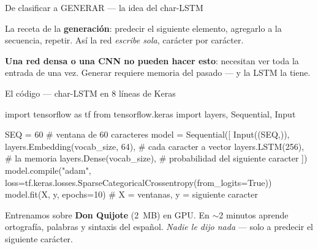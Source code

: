 \documentclass[aspectratio=169, 11pt]{beamer}
\begin{document}
\begin{frame}[shrink]{De clasificar a GENERAR --- la idea del char-LSTM}
  \vspace{4pt}
  \begin{center}
  \end{center}
  \vspace{6pt}
  \begin{tcolorbox}[colback=arcaRed!8, colframe=arcaRed, leftrule=3pt,
    boxrule=0pt, sharp corners, left=8pt, right=8pt, top=6pt, bottom=6pt]
    {\small\color{arcaDark}
    La receta de la \textbf{generación}: predecir el siguiente elemento, agregarlo
    a la secuencia, repetir. Así la red \emph{escribe sola}, carácter por carácter.\par
    \vspace{2pt}
    \textbf{Una red densa o una CNN no pueden hacer esto}: necesitan ver toda la
    entrada de una vez. Generar requiere memoria del pasado --- y la LSTM la tiene.}
  \end{tcolorbox}
\end{frame}

\begin{frame}{El código --- char-LSTM en 8 líneas de Keras}
  \begin{pyblock}
import tensorflow as tf
from tensorflow.keras import layers, Sequential, Input

SEQ = 60                                  # ventana de 60 caracteres
model = Sequential([
    Input((SEQ,)),
    layers.Embedding(vocab_size, 64),     # cada caracter a vector
    layers.LSTM(256),                     # la memoria
    layers.Dense(vocab_size),             # probabilidad del siguiente caracter
])
model.compile("adam", loss=tf.keras.losses.SparseCategoricalCrossentropy(from_logits=True))
model.fit(X, y, epochs=10)                # X = ventanas, y = siguiente caracter
  \end{pyblock}
  \vspace{4pt}
  {\footnotesize\color{arcaDark}
  Entrenamos sobre \textbf{Don Quijote} (2~MB) en GPU. En $\sim$2 minutos aprende
  ortografía, palabras y sintaxis del español. \emph{Nadie le dijo nada} --- solo a
  predecir el siguiente carácter.}
\end{frame}
\end{document}
